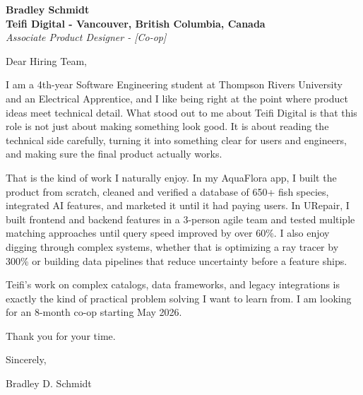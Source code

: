 \documentclass[11pt]{article}
\begin{document}
\textbf{Bradley Schmidt}\\
\vspace{0.5em}
\textbf{Teifi Digital - Vancouver, British Columbia, Canada}\\
\textit{Associate Product Designer - [Co-op]}

Dear Hiring Team,

\par

I am a 4th-year Software Engineering student at Thompson Rivers University and an Electrical Apprentice, and I like being right at the point where product ideas meet technical detail. What stood out to me about Teifi Digital is that this role is not just about making something look good. It is about reading the technical side carefully, turning it into something clear for users and engineers, and making sure the final product actually works.

\par

That is the kind of work I naturally enjoy. In my AquaFlora app, I built the product from scratch, cleaned and verified a database of 650+ fish species, integrated AI features, and marketed it until it had paying users. In URepair, I built frontend and backend features in a 3-person agile team and tested multiple matching approaches until query speed improved by over 60\%. I also enjoy digging through complex systems, whether that is optimizing a ray tracer by 300\% or building data pipelines that reduce uncertainty before a feature ships.

\par

Teifi’s work on complex catalogs, data frameworks, and legacy integrations is exactly the kind of practical problem solving I want to learn from. I am looking for an 8-month co-op starting May 2026.

\par

Thank you for your time.

\par

Sincerely,

\par

Bradley D. Schmidt
\end{document}
